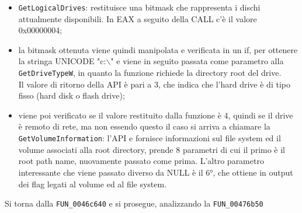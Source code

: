 \documentclass[12pt]{extarticle}
\begin{document}
\begin{itemize}
    \item \texttt{GetLogicalDrives}: restituisce una bitmask che rappresenta i dischi attualmente disponibili. In EAX a seguito della CALL c'è il valore 0x00000004; 
    \item la bitmask ottenuta viene quindi manipolata e verificata in un if, per ottenere la stringa UNICODE "c:$\backslash$" e viene in seguito passata come parametro alla \texttt{GetDriveTypeW}, in quanto la funzione richiede la directory root del drive.\\Il valore di ritorno della API è pari a 3, che indica che l'hard drive è di tipo fisso (hard disk o flash drive);
    \item viene poi verificato se il valore restituito dalla funzione è 4, quindi se il drive è remoto di rete, ma non essendo questo il caso si arriva a chiamare la \texttt{GetVolumeInformation}: l'API e fornisce informazioni sul file system ed il volume associati alla root directory, prende 8 parametri di cui il primo è il root path name, nuovamente passato come prima. L'altro parametro interessante che viene passato diverso da NULL è il 6°, che ottiene in output dei flag legati al volume ed al file system. 
\end{itemize}
Si torna dalla \texttt{FUN\_0046c640} e si prosegue, analizzando la \texttt{FUN\_00476b50}
\end{document}
